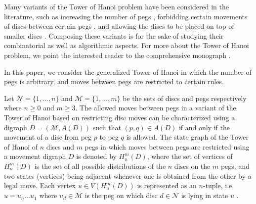 \documentclass[letterpaper,11pt]{article}
\begin{document}
Many variants of the Tower of Hanoi problem have been considered in the literature, such as increasing the number
of pegs \cite{dudeney2002canterbury,frame1941solution,stockmeyer1994variations }, forbidding certain movements
of discs between certain pegs \cite{stockmeyer1994variations, atkinson1981cyclic, sapir2004tower}, and allowing the discs to be placed on top of smaller discs \cite{wood1980towers}. Composing these variants is for the sake of studying their
combinatorial as well as algorithmic aspects. For more about the Tower of Hanoi
problem, we point the interested reader to the comprehensive monograph \cite{hinz2018tower}.

In this paper, we consider the generalized Tower of Hanoi in which the number of pegs is  arbitrary, and moves between pegs are restricted to certain rules. 

Let $\mathcal{N}=\{1,\ldots,n\}$ and $\mathcal{M}=\{1,\ldots,m\}$ be the sets of discs and pegs respectively where $n\geq 0$ and $m\geq 3$. 
The allowed moves between pegs in a variant of the Tower of Hanoi based on restricting disc moves can be characterized using a digraph $D=(\mathcal{M},A(D))$ such that $(p,q)\in A(D)$ if and only if the movement of a disc from peg $p$ to peg $q$ is allowed. The state graph of the Tower of Hanoi of $n$ discs and $m$ pegs in which moves between pegs are restricted using a movement digraph $D$ is denoted by $H_{n}^{m}(D)$, where the set of vertices of $H_{n}^{m}(D)$ is the set of all possible distributions of the $n$ discs on the $m$ pegs, and two states (vertices) being adjacent whenever one is obtained from the other by a
legal move.  Each vertex $u\in V(H_{n}^{m}(D))$ is represented  as an $n$-tuple, i.e,  $u = u_{n}\ldots u_{1}$ where $u_{d}\in \mathcal{M}$ is the peg on which disc $d\in\mathcal{N}$ is lying in state $u$ \cite{hinz2022dudeney}. 
\end{document}
